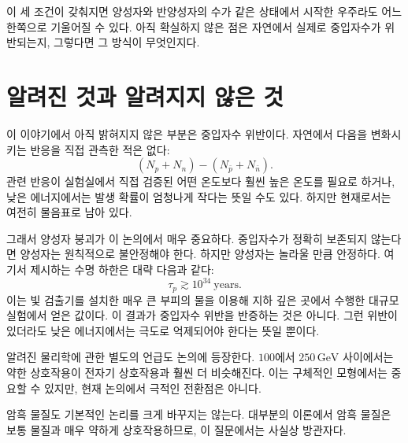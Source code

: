 \begin{classroomqa}
\end{classroomqa}

이 세 조건이 갖춰지면 양성자와 반양성자의 수가 같은 상태에서 시작한 우주라도 어느 한쪽으로 기울어질 수 있다. 아직 확실하지 않은 점은 자연에서 실제로 중입자수가 위반되는지, 그렇다면 그 방식이 무엇인지다.

\section{알려진 것과 알려지지 않은 것}

이 이야기에서 아직 밝혀지지 않은 부분은 중입자수 위반이다. 자연에서 다음을 변화시키는 반응을 직접 관측한 적은 없다:
\[
(N_p+N_n)-(N_{\bar p}+N_{\bar n}).
\]
관련 반응이 실험실에서 직접 검증된 어떤 온도보다 훨씬 높은 온도를 필요로 하거나, 낮은 에너지에서는 발생 확률이 엄청나게 작다는 뜻일 수도 있다. 하지만 현재로서는 여전히 물음표로 남아 있다.

그래서 양성자 붕괴가 이 논의에서 매우 중요하다. 중입자수가 정확히 보존되지 않는다면 양성자는 원칙적으로 불안정해야 한다. 하지만 양성자는 놀라울 만큼 안정하다. 여기서 제시하는 수명 하한은 대략 다음과 같다:
\[
\tau_p \gtrsim 10^{34}\ \text{years}.
\]
이는 빛 검출기를 설치한 매우 큰 부피의 물을 이용해 지하 깊은 곳에서 수행한 대규모 실험에서 얻은 값이다. 이 결과가 중입자수 위반을 반증하는 것은 아니다. 그런 위반이 있더라도 낮은 에너지에서는 극도로 억제되어야 한다는 뜻일 뿐이다.

알려진 물리학에 관한 별도의 언급도 논의에 등장한다. \(100\)에서 \(250\,\mathrm{GeV}\) 사이에서는 약한 상호작용이 전자기 상호작용과 훨씬 더 비슷해진다. 이는 구체적인 모형에서는 중요할 수 있지만, 현재 논의에서 극적인 전환점은 아니다.

암흑 물질도 기본적인 논리를 크게 바꾸지는 않는다. 대부분의 이론에서 암흑 물질은 보통 물질과 매우 약하게 상호작용하므로, 이 질문에서는 사실상 방관자다.

\begin{classroomqa}
\end{classroomqa}

